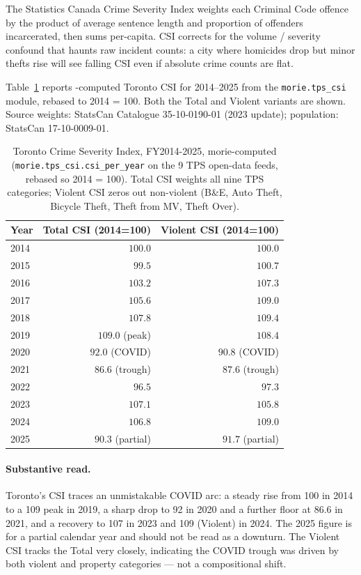 \documentclass[article,shortnames,nojss]{jss}
\begin{document}
The Statistics Canada Crime Severity Index
\citep{Wallace2009CSI} weights each Criminal Code offence by the
product of average sentence length and proportion of offenders
incarcerated, then sums per-capita.  CSI corrects for the volume /
severity confound that haunts raw incident counts: a city where
homicides drop but minor thefts rise will see falling CSI even if
absolute crime counts are flat.

Table~\ref{tab:csi-toronto} reports -computed Toronto CSI
for 2014--2025 from the
\texttt{morie.tps\_csi} module, rebased to 2014 = 100.  Both
the Total and Violent variants are shown.  Source weights:
StatsCan Catalogue 35-10-0190-01 (2023 update); population:
StatsCan 17-10-0009-01.

\begin{table}[h]
\centering\footnotesize
\caption{Toronto Crime Severity Index, FY2014-2025, morie-computed
(\texttt{morie.tps\_csi.csi\_per\_year} on the 9 TPS open-data
feeds, rebased so 2014 = 100).  Total CSI weights all nine TPS
categories; Violent CSI zeros out non-violent (B\&E, Auto Theft,
Bicycle Theft, Theft from MV, Theft Over).
}\label{tab:csi-toronto}
\begin{tabular}{lrr}
\toprule
Year & Total CSI (2014=100) & Violent CSI (2014=100)\\\midrule
2014 & $100.0$ & $100.0$\\
2015 & $\phantom{0}99.5$ & $100.7$\\
2016 & $103.2$ & $107.3$\\
2017 & $105.6$ & $109.0$\\
2018 & $107.8$ & $109.4$\\
2019 & $\mathbf{109.0}$ (peak) & $108.4$\\
2020 & $\phantom{0}92.0$ (COVID) & $\phantom{0}90.8$ (COVID)\\
2021 & $\phantom{0}86.6$ (trough) & $\phantom{0}87.6$ (trough)\\
2022 & $\phantom{0}96.5$ & $\phantom{0}97.3$\\
2023 & $107.1$ & $105.8$\\
2024 & $106.8$ & $\mathbf{109.0}$\\
2025 & $\phantom{0}90.3$ (partial) & $\phantom{0}91.7$ (partial)\\
\bottomrule
\end{tabular}
\end{table}

\paragraph{Substantive read.}  Toronto's CSI traces an unmistakable
COVID arc: a steady rise from 100 in 2014 to a 109 peak in 2019,
a sharp drop to 92 in 2020 and a further floor at 86.6 in 2021,
and a recovery to 107 in 2023 and 109 (Violent) in 2024.  The
2025 figure is for a partial calendar year and should not be
read as a downturn.  The Violent CSI tracks the Total very
closely, indicating the COVID trough was driven by both violent
and property categories --- not a compositional shift.
\end{document}
